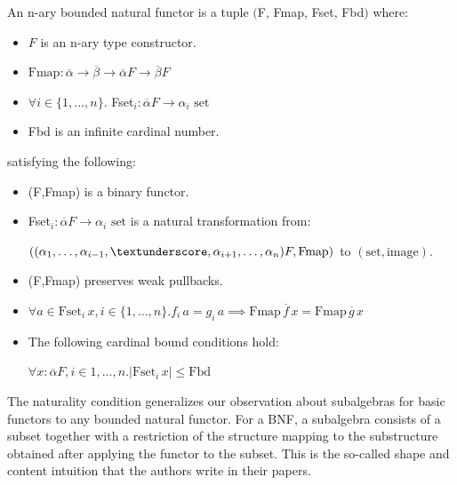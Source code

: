 \begin{definition}[BNF]
	An n-ary bounded natural functor is a tuple $($F, Fmap, Fset, Fbd$)$ where:
	
	\begin{itemize}
		\item $F$ is an n-ary type constructor.
		\item $\text{Fmap}: \overline{\alpha} \to \overline{\beta} \to \overline{\alpha} F \to \overline{\beta} F$
		\item $\forall i \in \{1,\ldots,n\}.$ Fset$_i: \overline{\alpha}F \to \alpha_i \text{ set}$
		\item Fbd is an infinite cardinal number.
	\end{itemize}
	
	satisfying the following:
	
	\begin{itemize}
		\item (F,Fmap) is a binary functor.
		\item Fset$_i: \overline{\alpha}F \to \alpha_i \text{ set}$ is a natural transformation from:
		
		$((\alpha_1,\ldots,\alpha_{i-1},\textunderscore,\alpha_{i+1},\ldots,\alpha_n)F, \text{Fmap})$ to $(\text{set}, \text{image})$.
		\item (F,Fmap) preserves weak pullbacks.
		\item $\forall a \in \text{Fset}_i \, x,  i \in \{1,\ldots,n\}. f_i \, a = g_i \, a \implies \text{Fmap} \, \overline{f} \, x = \text{Fmap} \, \overline{g} \, x$
		\item The following cardinal bound conditions hold:
		
		$\forall x : \overline{\alpha} F, i \in {1,\ldots,n}. |\text{Fset}_i \, x | \le \text{Fbd}$
	\end{itemize}
\end{definition}

The naturality condition generalizes our observation about subalgebras for basic functors to any bounded natural functor. For a BNF, a subalgebra consists of a subset together with a restriction of the structure mapping to the substructure obtained after applying the functor to the subset. This is the so-called shape and content intuition that the authors write in their papers.

